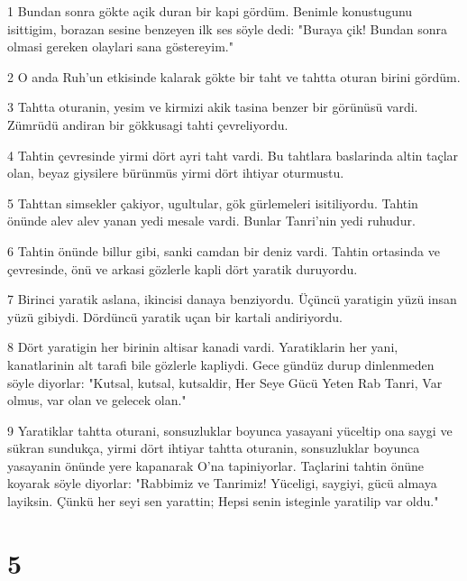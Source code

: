 \par 1 Bundan sonra gökte açik duran bir kapi gördüm. Benimle konustugunu isittigim, borazan sesine benzeyen ilk ses söyle dedi: "Buraya çik! Bundan sonra olmasi gereken olaylari sana göstereyim."
\par 2 O anda Ruh'un etkisinde kalarak gökte bir taht ve tahtta oturan birini gördüm.
\par 3 Tahtta oturanin, yesim ve kirmizi akik tasina benzer bir görünüsü vardi. Zümrüdü andiran bir gökkusagi tahti çevreliyordu.
\par 4 Tahtin çevresinde yirmi dört ayri taht vardi. Bu tahtlara baslarinda altin taçlar olan, beyaz giysilere bürünmüs yirmi dört ihtiyar oturmustu.
\par 5 Tahttan simsekler çakiyor, ugultular, gök gürlemeleri isitiliyordu. Tahtin önünde alev alev yanan yedi mesale vardi. Bunlar Tanri'nin yedi ruhudur.
\par 6 Tahtin önünde billur gibi, sanki camdan bir deniz vardi. Tahtin ortasinda ve çevresinde, önü ve arkasi gözlerle kapli dört yaratik duruyordu.
\par 7 Birinci yaratik aslana, ikincisi danaya benziyordu. Üçüncü yaratigin yüzü insan yüzü gibiydi. Dördüncü yaratik uçan bir kartali andiriyordu.
\par 8 Dört yaratigin her birinin altisar kanadi vardi. Yaratiklarin her yani, kanatlarinin alt tarafi bile gözlerle kapliydi. Gece gündüz durup dinlenmeden söyle diyorlar: "Kutsal, kutsal, kutsaldir, Her Seye Gücü Yeten Rab Tanri, Var olmus, var olan ve gelecek olan."
\par 9 Yaratiklar tahtta oturani, sonsuzluklar boyunca yasayani yüceltip ona saygi ve sükran sundukça, yirmi dört ihtiyar tahtta oturanin, sonsuzluklar boyunca yasayanin önünde yere kapanarak O'na tapiniyorlar. Taçlarini tahtin önüne koyarak söyle diyorlar: "Rabbimiz ve Tanrimiz! Yüceligi, saygiyi, gücü almaya layiksin. Çünkü her seyi sen yarattin; Hepsi senin isteginle yaratilip var oldu."

\chapter{5}

